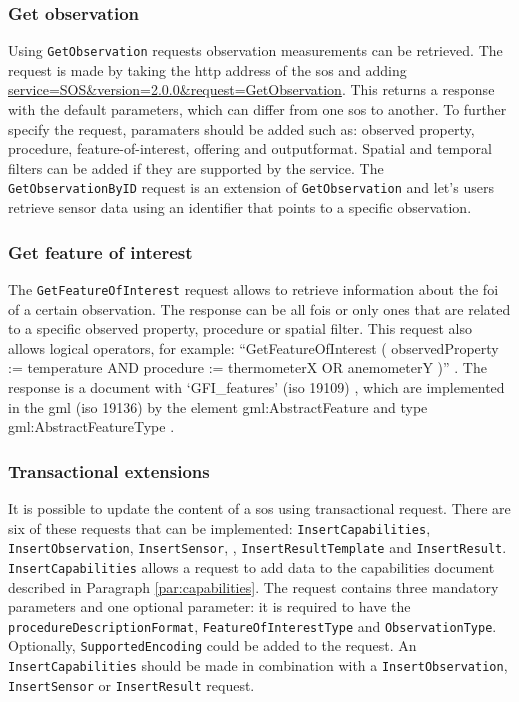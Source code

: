 \subsubsection{Get observation}
\label{par:getObservation}

Using \texttt{GetObservation} requests observation measurements can be retrieved. The request is made by taking the \ac{http} address of the \ac{sos} and adding \url{service=SOS\&version=2.0.0\&request=GetObservation}. This returns a response with the default parameters, which can differ from one \ac{sos} to another. To further specify the request, paramaters should be added such as: observed property, procedure, feature-of-interest, offering and outputformat. Spatial and temporal filters can be added if they are supported by the service. The \texttt{GetObservationByID} request is an extension of \texttt{GetObservation} and let's users retrieve sensor data using an identifier that points to a specific observation.



\subsubsection{Get feature of interest}
The \texttt{GetFeatureOfInterest} request allows to retrieve information about the \ac{foi} of a certain observation. The response can be all \acp{foi} or only ones that are related to a specific observed property, procedure or spatial filter. This request also allows logical operators, for example: \enquote{GetFeatureOfInterest ( observedProperty := temperature AND procedure := thermometerX OR anemometerY )} \citep[p. 40]{SW:OGC2}. The response is a document with `GFI\_features' (\ac{iso} 19109) \citep{GEO:ISO}, which are implemented in the \ac{gml} (\ac{iso} 19136) \citep{GEO:ISO2} by the element gml:AbstractFeature and type gml:AbstractFeatureType \citep[p. 38]{SW:ISO}.

\subsubsection{Transactional extensions}
\begin{sloppypar}
It is possible to update the content of a \ac{sos} using transactional request. There are six of these requests that can be implemented: \texttt{InsertCapabilities}, \texttt{InsertObservation}, \texttt{InsertSensor}, , \texttt{InsertResultTemplate} and \texttt{InsertResult}. \texttt{InsertCapabilities} allows a request to add data to the capabilities document described in Paragraph \ref{par:capabilities}. The request contains three mandatory parameters and one optional parameter: it is required to have the \texttt{procedureDescriptionFormat}, \texttt{FeatureOfInterestType} and \texttt{ObservationType}. Optionally, \texttt{SupportedEncoding} could be added to the request. An \texttt{InsertCapabilities} should be made in combination with a \texttt{InsertObservation}, \texttt{InsertSensor} or \texttt{InsertResult} request.
\end{sloppypar}


